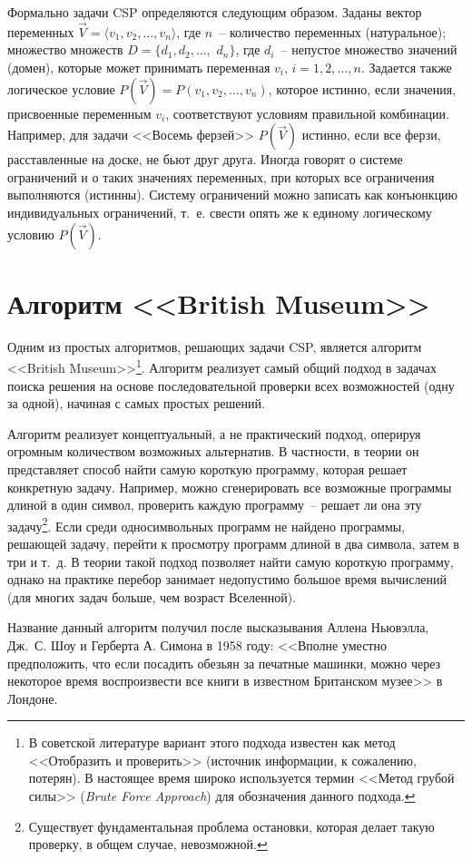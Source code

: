 \documentclass[a4paper,14pt, openany, twoside, final]{extbook} %
\newcommand{\eeng}[1]{\emph{\foreignlanguage{english}{#1}}}
\begin{document}
Формально задачи CSP определяются следующим образом. Заданы вектор переменных $\vec{V}=\langle v_1, v_2, \ldots, v_n\rangle$, где $n$~-- количество переменных (натуральное); множество множеств $D=\{ d_1, d_2, \ldots,$ $d_n\}$, где $d_i$~-- непустое множество значений (домен), которые может принимать переменная $v_i$, $i=1,2,\ldots,n$. Задается также логическое условие $P(\vec{V})=P(v_1,v_2,\ldots,v_n)$, которое истинно, если значения, присвоенные переменным $v_i$, соответствуют условиям правильной комбинации. Например, для задачи <<Восемь ферзей>> $P(\vec{V})$ истинно, если все ферзи, расставленные на доске, не бьют друг друга. Иногда говорят о системе ограничений и о таких значениях переменных, при которых все ограничения выполняются (истинны). Систему ограничений можно записать как конъюнкцию индивидуальных ограничений, т.~е. свести опять же к единому логическому условию $P(\vec{V})$.

\section{Алгоритм <<British Museum>>}

Одним из простых алгоритмов, решающих задачи CSP, является алгоритм <<British Museum>>\footnote{В советской литературе вариант этого подхода известен как метод <<Отобразить и проверить>> (источник информации, к сожалению, потерян). В настоящее время широко используется термин <<Метод грубой силы>> (\eeng{Brute Force Approach}) для обозначения данного подхода.}. Алгоритм реализует самый общий подход в задачах поиска решения на основе последовательной проверки всех возможностей (одну за одной), начиная с самых простых решений.

Алгоритм реализует концептуальный, а не практический подход, оперируя огромным количеством возможных альтернатив. В частности, в теории он представляет способ найти самую короткую программу, которая решает конкретную задачу. Например, можно сгенерировать все возможные программы длиной в один символ, проверить каждую программу~-- решает ли она эту задачу\footnote{Существует фундаментальная проблема остановки, которая делает такую проверку, в общем случае, невозможной.}. Если среди односимвольных программ не найдено программы, решающей задачу, перейти к просмотру программ длиной в два символа, затем в три и т.~д. В теории такой подход позволяет найти самую короткую программу, однако на практике перебор занимает недопустимо большое время вычислений (для многих задач больше, чем возраст Вселенной).

Название данный алгоритм получил после высказывания Аллена Ньювэлла, Дж.~С. Шоу и Герберта А. Симона в 1958 году: <<Вполне уместно предположить, что если посадить обезьян за печатные машинки, можно через некоторое время воспроизвести все книги в известном Британском музее>> в Лондоне.
\end{document}
